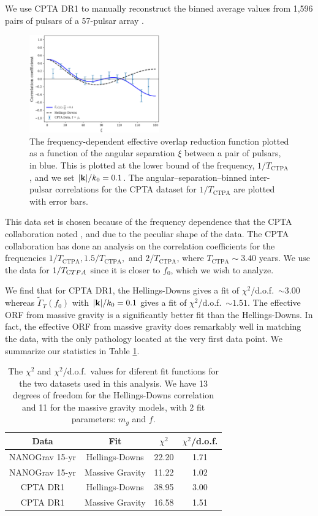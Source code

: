 \documentclass[prd,aps,psfig,nofootinbib,nobibnotes,superscriptaddress,preprintnumbers,times]{revtex4-2}\setlength{\topmargin}{-14mm}
\begin{document}
We use CPTA DR1 to manually reconstruct the binned average values from 1,596 pairs of pulsars of a 57-pulsar array \cite{Xu:2023wog}. 
\begin{figure}[h]
    \centering
    \includegraphics[width=0.5\textwidth]{fig3.pdf}
    \caption{The frequency-dependent effective overlap reduction function plotted as a function of the angular separation $\xi$ between a pair of pulsars, in blue. This is plotted at the lower bound of the frequency, $1/T_{\text{CTPA}}$, and we set $|{\bf k}|/k_0 = 0.1$. The angular–separation–binned inter-pulsar correlations for the CPTA dataset for $1/T_{\text{CTPA}}$ are plotted with error bars.}
    \label{fig:cpta}
\end{figure}
This data set is chosen because of the frequency dependence that the CPTA collaboration noted \cite{Xu:2023wog}, and due to the peculiar shape of the data. The CPTA collaboration has done an analysis on the correlation coefficients for the frequencies $1/T_{\text{CTPA}}, 1.5/T_{\text{CTPA}},$ and $2/T_{\text{CTPA}}$, where $T_{\text{CTPA}} \sim 3.40$ years. We use the data for $1/T_{\text CTPA}$ since it is closer to $f_0$, which we wish to analyze. 

We find that for CPTA DR1, the Hellings-Downs gives a fit of $\chi^2$/d.o.f.\ $\sim 3.00$ whereas $\tilde{\Gamma}_T(f_0)$ with $|{\bf k}|/k_0 = 0.1$ gives a fit of $\chi^2$/d.o.f.\ $\sim 1.51$. The effective ORF from massive gravity is a significantly better fit than the Hellings-Downs. In fact, the effective ORF from massive gravity does remarkably well in matching the data, with the only pathology located at the very first data point.
We summarize our statistics in Table \ref{tbl:chi}. 
\begin{table}[h] 
\centering
\renewcommand{\arraystretch}{1.8}
\begin{tabular}{|c|c|c|c|}
\hline
\textbf{Data} & \textbf{Fit} & \textbf{$\chi^2$} & \textbf{$\chi^2$/d.o.f.} \\
\hline
NANOGrav 15-yr & Hellings-Downs & 22.20 & 1.71 \\
\hline
NANOGrav 15-yr & Massive Gravity & 11.22 & 1.02 \\
\hline
CPTA DR1 & Hellings-Downs & 38.95 & 3.00 \\
\hline
CPTA DR1 & Massive Gravity & 16.58 & 1.51 \\
\hline
\end{tabular}
\caption{The $\chi^2$ and $\chi^2$/d.o.f.\ values for diferent fit functions for the two datasets used in this analysis. We have 13 degrees of freedom for the Hellings-Downs correlation and 11 for the massive gravity models, with 2 fit parameters: $m_g$ and $f$. }
\label{tbl:chi}
\end{table}
\end{document}
